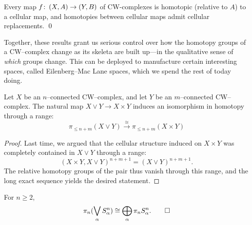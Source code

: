 \begin{corollary}
Every map $f\colon\thinspace (X, A) \to (Y, B)$ of CW-complexes is homotopic (relative to $A$) to a cellular map, and homotopies between cellular maps admit cellular replacements. \qed
\end{corollary}

Together, these results grant us serious control over how the homotopy groups of a CW--complex change as its skeleta are built up---in the qualitative sense of \emph{which} groups change.
This can be deployed to manufacture certain interesting spaces, called Eilenberg--Mac Lane spaces, which we spend the rest of today doing.

\begin{corollary}
Let $X$ be an $n$--connected CW--complex, and let $Y$ be an $m$--connected CW--complex.
The natural map $X \vee Y \to X \times Y$ induces an isomorphism in homotopy through a range: \[\pi_{\le n+m}(X \vee Y) \xrightarrow\cong \pi_{\le n+m}(X \times Y)\]
\end{corollary}
\begin{proof}
Last time, we argued that the cellular structure induced on $X \times Y$ was completely contained in $X \vee Y$ through a range: \[(X \times Y, X \vee Y)^{n+m+1} = (X \vee Y)^{n+m+1}.\]
The relative homotopy groups of the pair thus vanish through this range, and the long exact sequence yields the desired statement.
\end{proof}

\begin{corollary}\label{PinOfSphereBouquet}%
For $n \ge 2$,
\[\pi_n(\bigvee_\alpha S^n_\alpha) \cong \bigoplus_\alpha \pi_n S^n_\alpha.
\qed\]
\end{corollary}

